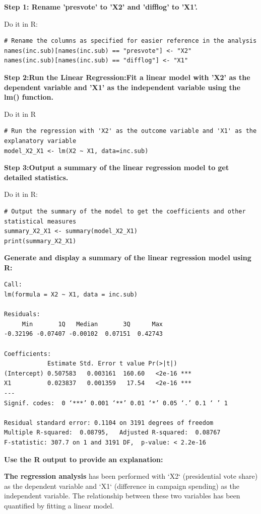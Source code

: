 \documentclass[12pt]{article}
\begin{document}
 \textbf{Step 1: Rename 'presvote' to 'X2' and 'difflog' to 'X1'.} 

 Do it in R:
\begin{lstlisting}
# Rename the columns as specified for easier reference in the analysis
names(inc.sub)[names(inc.sub) == "presvote"] <- "X2"
names(inc.sub)[names(inc.sub) == "difflog"] <- "X1"
\end{lstlisting}

\textbf{Step 2:Run the Linear Regression:Fit a linear model with 'X2' as the dependent variable and 'X1' as the independent variable using the lm() function.}

Do it in R
\begin{lstlisting}
# Run the regression with 'X2' as the outcome variable and 'X1' as the explanatory variable
model_X2_X1 <- lm(X2 ~ X1, data=inc.sub)
\end{lstlisting}

\textbf{Step 3:Output a summary of the linear regression model to get detailed statistics.}

Do it in R:
\begin{lstlisting}
# Output the summary of the model to get the coefficients and other statistical measures
summary_X2_X1 <- summary(model_X2_X1)
print(summary_X2_X1)
\end{lstlisting}

\textbf{Generate and display a summary of the linear regression model using R:}
\begin{center}
\begin{BVerbatim}
Call:
lm(formula = X2 ~ X1, data = inc.sub)

Residuals:
     Min       1Q   Median       3Q      Max 
-0.32196 -0.07407 -0.00102  0.07151  0.42743 

Coefficients:
            Estimate Std. Error t value Pr(>|t|)    
(Intercept) 0.507583   0.003161  160.60   <2e-16 ***
X1          0.023837   0.001359   17.54   <2e-16 ***
---
Signif. codes:  0 ‘***’ 0.001 ‘**’ 0.01 ‘*’ 0.05 ‘.’ 0.1 ‘ ’ 1

Residual standard error: 0.1104 on 3191 degrees of freedom
Multiple R-squared:  0.08795,	Adjusted R-squared:  0.08767 
F-statistic: 307.7 on 1 and 3191 DF,  p-value: < 2.2e-16
\end{BVerbatim}
\end{center}

\textbf{Use the R output to provide an explanation:}


\textbf{The regression analysis} has been performed with `X2` (presidential vote share) as the dependent variable and `X1` (difference in campaign spending) as the independent variable. The relationship between these two variables has been quantified by fitting a linear model.
\end{document}
